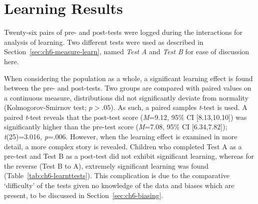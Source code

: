 \section{Learning Results} \label{sec:ch6-embodiment-results}
Twenty-six pairs of pre- and post-tests were logged during the interactions for analysis of learning. Two different tests were used as described in Section~\ref{sec:ch6-measure-learn}, named \textit{Test A} and \textit{Test B} for ease of discussion here.

When considering the population as a whole, a significant learning effect is found between the pre- and post-tests. Two groups are compared with paired values on a continuous measure, distributions did not significantly deviate from normality (Kolmogorov-Smirnov test; $\textit{p}>.05$). As such, a paired samples \textit{t}-test is used. A paired \textit{t}-test reveals that the post-test score (\textit{M}=9.12, 95\% CI [8.13,10.10]) was significantly higher than the pre-test score (\textit{M}=7.08, 95\% CI [6.34,7.82]); \textit{t}(25)=3.016, \textit{p}=.006. However, when the learning effect is examined in more detail, a more complex story is revealed. Children who completed Test A as a pre-test and Test B as a post-test did not exhibit significant learning, whereas for the reverse (Test B to A), extremely significant learning was found (Table~\ref{tab:ch6-learnttests}). This complication is due to the comparative `difficulty' of the tests given no knowledge of the data and biases which are present, to be discussed in Section~\ref{sec:ch6-biasing}.

